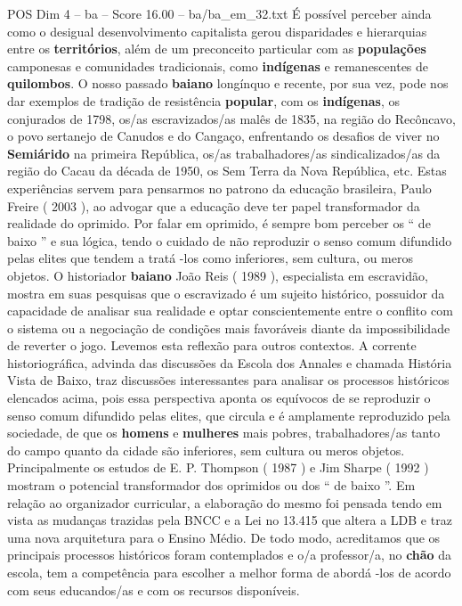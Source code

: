 \begin{textsample}{POS Dim 4 – ba – Score 16.00 – ba/ba\_em\_32.txt}
É possível perceber ainda como o desigual desenvolvimento capitalista gerou disparidades e hierarquias entre os \textbf{territórios}, além de um preconceito particular com as \textbf{populações} camponesas e comunidades tradicionais, como \textbf{indígenas} e remanescentes de \textbf{quilombos}.
O nosso passado \textbf{baiano} longínquo e recente, por sua vez, pode nos dar exemplos de tradição de resistência \textbf{popular}, com os \textbf{indígenas}, os conjurados de 1798, os/as escravizados/as malês de 1835, na região do Recôncavo, o povo sertanejo de Canudos e do Cangaço, enfrentando os desafios de viver no \textbf{Semiárido} na primeira República, os/as trabalhadores/as sindicalizados/as da região do Cacau da década de 1950, os Sem Terra da Nova República, etc.
Estas experiências servem para pensarmos no patrono da educação brasileira, Paulo Freire ( 2003 ), ao advogar que a educação deve ter papel transformador da realidade do oprimido.
Por falar em oprimido, é sempre bom perceber os “ de baixo ” e sua lógica, tendo o cuidado de não reproduzir o senso comum difundido pelas elites que tendem a tratá -los como inferiores, sem cultura, ou meros objetos.
O historiador \textbf{baiano} João Reis ( 1989 ), especialista em escravidão, mostra em suas pesquisas que o escravizado é um sujeito histórico, possuidor da capacidade de analisar sua realidade e optar conscientemente entre o conflito com o sistema ou a negociação de condições mais favoráveis diante da impossibilidade de reverter o jogo.
Levemos esta reflexão para outros contextos.
A corrente historiográfica, advinda das discussões da Escola dos Annales e chamada História Vista de Baixo, traz discussões interessantes para analisar os processos históricos elencados acima, pois essa perspectiva aponta os equívocos de se reproduzir o senso comum difundido pelas elites, que circula e é amplamente reproduzido pela sociedade, de que os \textbf{homens} e \textbf{mulheres} mais pobres, trabalhadores/as tanto do campo quanto da cidade são inferiores, sem cultura ou meros objetos.
Principalmente os estudos de E.
P.
Thompson ( 1987 ) e Jim Sharpe ( 1992 ) mostram o potencial transformador dos oprimidos ou dos “ de baixo ”.
Em relação ao organizador curricular, a elaboração do mesmo foi pensada tendo em vista as mudanças trazidas pela BNCC e a Lei no 13.415 que altera a LDB e traz uma nova arquitetura para o Ensino Médio.
De todo modo, acreditamos que os principais processos históricos foram contemplados e o/a professor/a, no \textbf{chão} da escola, tem a competência para escolher a melhor forma de abordá -los de acordo com seus educandos/as e com os recursos disponíveis.

\end{textsample}
